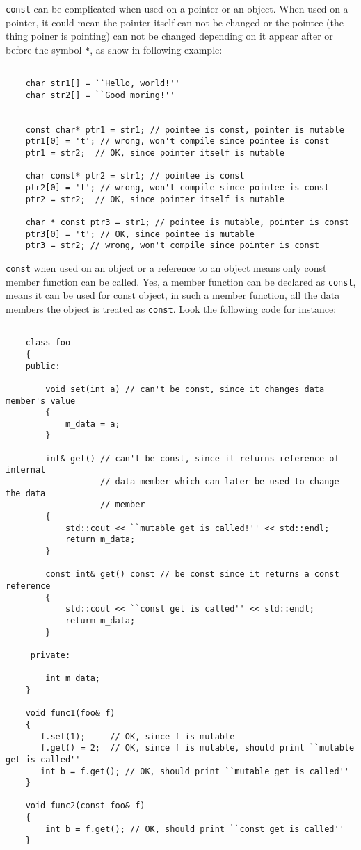 \documentclass[letterpaper]{book}
\begin{document}
\lstinline$const$ can be complicated when used on a pointer or an object.
When used on a pointer, it could mean the pointer itself can not be changed
or the pointee (the thing poiner is pointing) can not be changed depending on
it appear after or before the symbol \lstinline$*$, as show in following example:


\begin{lstlisting}

    char str1[] = ``Hello, world!''
    char str2[] = ``Good moring!''


    const char* ptr1 = str1; // pointee is const, pointer is mutable
    ptr1[0] = 't'; // wrong, won't compile since pointee is const
    ptr1 = str2;  // OK, since pointer itself is mutable

    char const* ptr2 = str1; // pointee is const
    ptr2[0] = 't'; // wrong, won't compile since pointee is const
    ptr2 = str2;  // OK, since pointer itself is mutable
    
    char * const ptr3 = str1; // pointee is mutable, pointer is const
    ptr3[0] = 't'; // OK, since pointee is mutable
    ptr3 = str2; // wrong, won't compile since pointer is const

\end{lstlisting}

\lstinline$const$ when used on an object or a reference to an object means
only const member function can be called. Yes, a member function can be declared
as \lstinline$const$, means it can be used for const object, in such a member function,
all the data members the object is treated as \lstinline$const$. Look the following
code for instance:

\begin{lstlisting}

    class foo
    {
    public:

        void set(int a) // can't be const, since it changes data member's value
        {
            m_data = a;
        }

        int& get() // can't be const, since it returns reference of internal
                   // data member which can later be used to change the data 
                   // member
        {
            std::cout << ``mutable get is called!'' << std::endl;
            return m_data;
        }

        const int& get() const // be const since it returns a const reference
        {
            std::cout << ``const get is called'' << std::endl;
            returm m_data;
        }

     private:

        int m_data;
    }

    void func1(foo& f)
    {
       f.set(1);     // OK, since f is mutable
       f.get() = 2;  // OK, since f is mutable, should print ``mutable get is called''
       int b = f.get(); // OK, should print ``mutable get is called''
    }

    void func2(const foo& f)
    {
        int b = f.get(); // OK, should print ``const get is called''
    }


\end{lstlisting}
\end{document}
